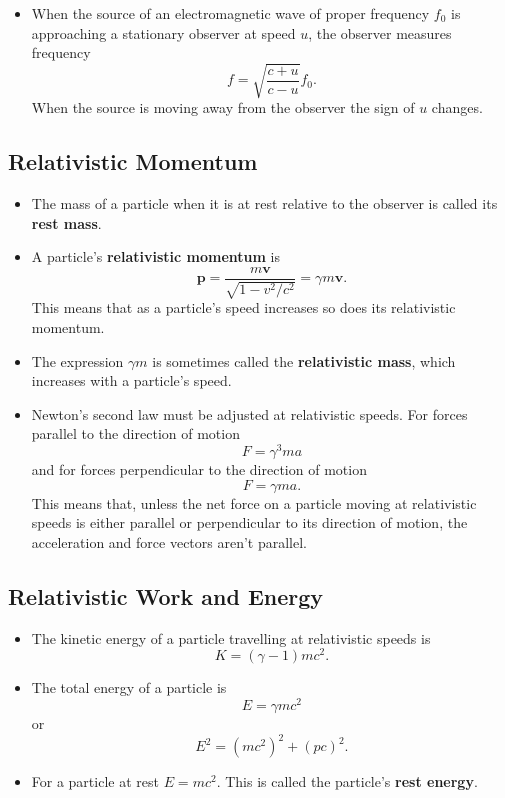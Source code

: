 \documentclass{article}
\begin{document}
\begin{itemize}
  \item When the source of an electromagnetic wave of proper frequency $f_0$ is approaching a stationary observer at speed $u$, the observer measures frequency \[f = \sqrt{\frac{c + u}{c - u}} f_0.\] When the source is moving away from the observer the sign of $u$ changes.
\end{itemize}

\subsection{Relativistic Momentum}

\begin{itemize}
  \item The mass of a particle when it is at rest relative to the observer is called its \textbf{rest mass}.

  \item A particle's \textbf{relativistic momentum} is \[\mathbf{p} = \frac{m \mathbf{v}}{\sqrt{1 - v^2 / c^2}} = \gamma m \mathbf{v}.\] This means that as a particle's speed increases so does its relativistic momentum.

  \item The expression $\gamma m$ is sometimes called the \textbf{relativistic mass}, which increases with a particle's speed.

  \item Newton's second law must be adjusted at relativistic speeds. For forces parallel to the direction of motion \[F = \gamma^3 m a\] and for forces perpendicular to the direction of motion \[F = \gamma m a.\] This means that, unless the net force on a particle moving at relativistic speeds is either parallel or perpendicular to its direction of motion, the acceleration and force vectors aren't parallel.
\end{itemize}

\subsection{Relativistic Work and Energy}

\begin{itemize}
  \item The kinetic energy of a particle travelling at relativistic speeds is \[K = (\gamma - 1) m c^2.\]

  \item The total energy of a particle is \[E = \gamma m c^2\] or \[E^2 = (m c^2)^2 + (p c)^2.\]

  \item For a particle at rest $E = m c^2$. This is called the particle's \textbf{rest energy}.
\end{itemize}
\end{document}
